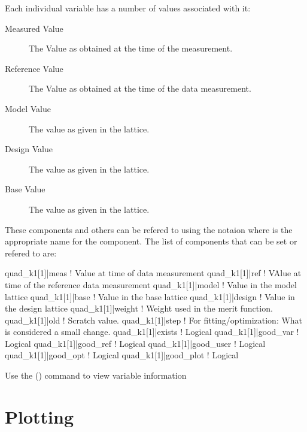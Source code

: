 Each individual variable has a number of values associated with it:
  \vspace*{-3ex}
  \begin{description}
  \item[Measured Value] \Newline
The Value as obtained at the time of the  measurement.
  \item[Reference Value] \Newline
The Value as obtained at the time of the  data  measurement.
  \item[Model Value] \Newline
The value as given in the  lattice.
  \item[Design Value] \Newline
The value as given in the  lattice.
  \item[Base Value] \Newline
The value as given in the  lattice.
  \end{description}
These components and others can be refered to using the notaion  where
 is the appropriate name for the component. The list of
components that can be set or refered to are:
\begin{example}
  quad_k1[1]|meas      ! Value at time of data measurement
  quad_k1[1]|ref       ! VAlue at time of the reference data measurement
  quad_k1[1]|model     ! Value in the model lattice
  quad_k1[1]|base      ! Value in the base lattice
  quad_k1[1]|design    ! Value in  the design lattice
  quad_k1[1]|weight    ! Weight used in the merit function.
  quad_k1[1]|old       ! Scratch value.
  quad_k1[1]|step      ! For fitting/optimization: What is considered a small change.
  quad_k1[1]|exists    ! Logical
  quad_k1[1]|good_var  ! Logical
  quad_k1[1]|good_ref  ! Logical
  quad_k1[1]|good_user ! Logical
  quad_k1[1]|good_opt  ! Logical
  quad_k1[1]|good_plot ! Logical
\end{example}

Use the  () command to view variable information

\section{Plotting}
\label{s:plotting}

